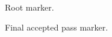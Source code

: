 \documentclass{article}
\begin{document}
Root marker.

\newpage
Final accepted pass marker.
\end{document}

